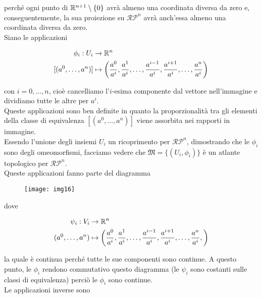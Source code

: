 perché ogni punto di $ \mathbb{R}^{n+1} \setminus \{0\} $ avrà almeno una coordinata diversa da zero e, conseguentemente, la sua proiezione su $ \mathcal{RP}^{n} $ avrà anch'essa almeno una coordinata diversa da zero.\\
Siano le applicazioni

\begin{align}
	\begin{split}
		\phi_{i} : U_{i} &\to \mathbb{R}^{n}\\
		[(a^{0},\dots,a^{n})] &\mapsto \left( \dfrac{a^{0}}{a^{i}}, \dfrac{a^{1}}{a^{i}}, \dots, \dfrac{a^{i-1}}{a^{i}}, \dfrac{a^{i+1}}{a^{i}}, \dots, \dfrac{a^{n}}{a^{i}} \right)
	\end{split}
\end{align}

con $ i=0,\dots,n $, cioè cancelliamo l'$ i $-esima componente dal vettore nell'immagine e dividiamo tutte le altre per $ a^{i} $.\\
Queste applicazioni sono ben definite in quanto la proporzionalità tra gli elementi della classe di equivalenza $ [(a^{0},\dots,a^{n})] $ viene assorbita nei rapporti in immagine.\\
Essendo l'unione degli insiemi $ U_{i} $ un ricoprimento per $ \mathcal{RP}^{n} $, dimostrando che le $ \phi_{i} $ sono degli omeomorfismi, facciamo vedere che $ \mathfrak{M} = \{(U_{i},\phi_{i})\} $ è un atlante topologico per $ \mathcal{RP}^{n} $.\\
Queste applicazioni fanno parte del diagramma

\begin{figure}[H]
	\centering
	\texttt{[image: img16]}
\end{figure}

dove

\begin{align}
	\begin{split}
		\psi_{i} : V_{i} &\to \mathbb{R}^{n}\\
		(a^{0},\dots,a^{n}) &\mapsto \left( \dfrac{a^{0}}{a^{i}}, \dfrac{a^{1}}{a^{i}}, \dots, \dfrac{a^{i-1}}{a^{i}}, \dfrac{a^{i+1}}{a^{i}}, \dots, \dfrac{a^{n}}{a^{i}}, \right)
	\end{split}
\end{align}

la quale è continua perché tutte le sue componenti sono continue. A questo punto, le $ \phi_{i} $ rendono commutativo questo diagramma (le $ \psi_{i} $ sono costanti sulle classi di equivalenza) perciò le $ \phi_{i} $ sono continue.\\
Le applicazioni inverse sono

